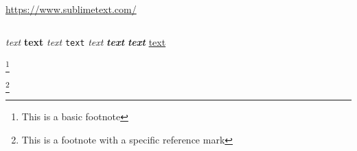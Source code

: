 \documentclass[12pt]{article}
\begin{document}
\cite[\command]{my:bib:key}
%



\url{https://www.sublimetext.com/}

\href{https://www.sublimetext.com/}











\inputminted{py}{path/to/file.py}



\emph{text}
\textbf{text}
\textit{text}
\texttt{text}
\textsl{text}
\textbf{\textit{text}}
\textit{\textbf{text}}
\underline{text}



\footnote{This is a basic footnote}

\footnote [ 5 ] {This is a footnote with a specific reference mark}
\end{document}
